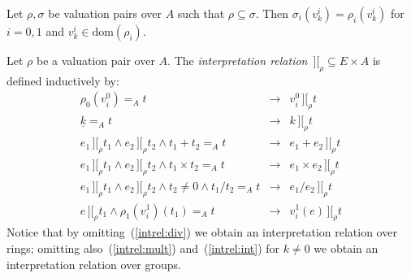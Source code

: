 \documentclass[numreferences]{kluwer}
\newcommand{\intII}{\,]\![}
\newcommand{\intrel}{\mathbin{\intII_{\rho}}}
\newcommand{\domain}{\ensuremath{\mathrm{dom}}}
\begin{document}
\begin{article}
\begin{proposition}\label{valpair:incl:wdef}
Let $\rho,\sigma$ be valuation pairs over $A$ such that
$\rho\subseteq\sigma$.  Then $\sigma_i(v^i_k)=\rho_i(v^i_k)$ for $i=0,1$
and $v^i_k\in\domain(\rho_i)$.
\end{proposition}


\begin{definition}\label{defn:intrel}
Let $\rho$ be a valuation pair over $A$.  The \emph{interpretation
relation} $\intrel\subseteq E\times A$ is defined inductively by:
\begin{eqnarray}
\label{intrel:var0}
\rho_0(v^0_i)=_A t & \rightarrow & v^0_i\intrel t\\
\label{intrel:int}
\underline k=_A t & \rightarrow & k\intrel t\\
\label{intrel:plus}
 e_1\intrel t_1 \wedge e_2\intrel t_2 \wedge t_1+t_2=_A t
& \rightarrow & e_1+e_2\intrel t\\
\label{intrel:mult}
 e_1\intrel t_1 \wedge e_2\intrel t_2 \wedge t_1\times t_2=_A t
& \rightarrow & e_1\times e_2\intrel t\\
\label{intrel:div}
 e_1\intrel t_1 \wedge e_2\intrel t_2 \wedge t_2\neq 0 \wedge t_1/t_2=_A t
& \rightarrow & e_1/e_2\intrel t\\
\label{intrel:var1}
 e\intrel t_1 \wedge \rho_1(v^1_i)(t_1)=_A t & \rightarrow & v^1_i(e)\intrel t
\end{eqnarray}
Notice that by omitting~(\ref{intrel:div}) we obtain an interpretation relation
over rings; omitting also~(\ref{intrel:mult}) and~(\ref{intrel:int}) for
$k\neq 0$ we obtain an interpretation relation over groups.
\end{definition}


\end{article}
\end{document}

